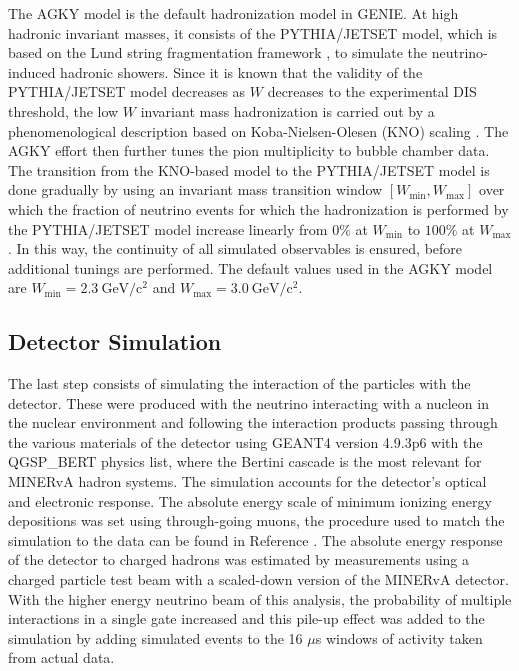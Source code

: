 \documentclass[aps, prd, twocolumn, showpacs, superscriptaddress, floatfix]{revtex4-2}
\begin{document}
The AGKY model \cite{Yang:2009zx} is the default hadronization model in GENIE. At high hadronic invariant masses, it consists of the PYTHIA/JETSET \cite{Torbjorn_Sjostrand_2006} model, which is based on the Lund string fragmentation framework \cite{ANDERSSON198331}, to simulate the neutrino-induced hadronic showers. Since it is known that the validity of the PYTHIA/JETSET model decreases as $W$ decreases to the experimental DIS threshold, the low $W$ invariant mass hadronization is carried out by a phenomenological description based on Koba-Nielsen-Olesen (KNO) scaling \cite{KOBA1972317}. The AGKY effort then further tunes the pion multiplicity to bubble chamber data. The transition from the KNO-based model to the PYTHIA/JETSET model is done gradually by using an invariant mass transition window $[W_\mathrm{min}, W_\mathrm{max}]$ over which the fraction of neutrino events for which the hadronization is performed by the PYTHIA/JETSET model increase linearly from $0\%$ at $W_\mathrm{min}$ to $100\%$ at $W_\mathrm{max}$. In this way, the continuity of all simulated observables is ensured, before additional tunings are performed. The default values used in the AGKY model are $W_\mathrm{min} = 2.3\ \mathrm{GeV/c^2}$ and $W_\mathrm{max} = 3.0\ \mathrm{GeV/c^2}$. 

\subsection{Detector Simulation}
The last step consists of simulating the interaction of the particles with the detector. These were produced with the neutrino interacting with a nucleon in the nuclear environment and following the interaction products passing through the various materials of the detector using GEANT4 \cite{Agostinelli2003} version 4.9.3p6 with the QGSP\_BERT physics list, where the Bertini cascade is the most relevant for MINERvA hadron systems. The simulation accounts for the detector's optical and electronic response. The absolute energy scale of minimum ionizing energy depositions was set using through-going muons, the procedure used to match the simulation to the data can be found in Reference \cite{ALIAGA2014130}. The absolute energy response of the detector to charged hadrons was estimated by measurements using a charged particle test beam \cite{Aliaga:2015aqe} with a scaled-down version of the MINERvA detector. With the higher energy neutrino beam of this analysis, the probability of multiple interactions in a single gate increased and this pile-up effect was added to the simulation by adding simulated events to the 16 $\mu$s windows of activity taken from actual data.
\end{document}
